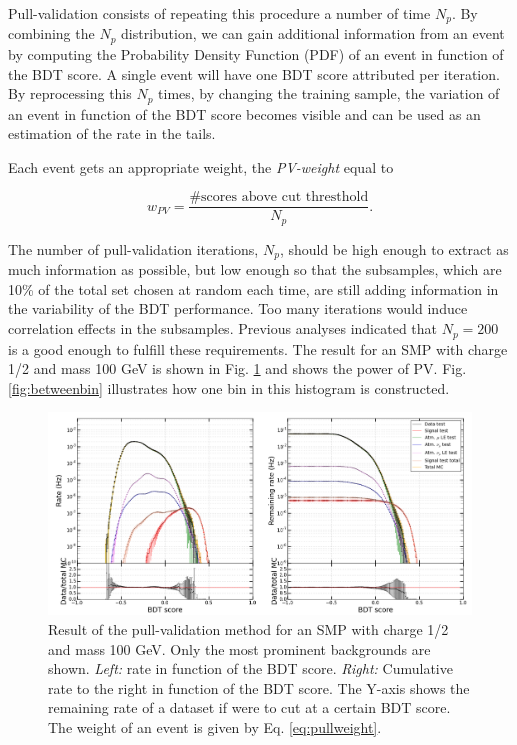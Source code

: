 Pull-validation consists of repeating this procedure a number of time $N_p$. By combining the $N_p$ distribution, we can gain additional information from an event by computing the Probability Density Function (PDF) of an event in function of the BDT score. A single event will have one BDT score attributed per iteration. By reprocessing this $N_p$ times, by changing the training sample, the variation of an event in function of the BDT score becomes visible and can be used as an estimation of the rate in the tails.

Each event gets an appropriate weight, the \textit{PV-weight} equal to

\begin{equation}
\label{eq:pullweight}
w_{PV} = \frac{\# \textrm{scores above cut thresthold}}{N_p}.
\end{equation}

The number of pull-validation iterations, $N_p$, should be high enough to extract as much information as possible, but low enough so that the subsamples, which are 10\% of the total set chosen at random each time, are still adding information in the variability of the BDT performance. Too many iterations would induce correlation effects in the subsamples. Previous analyses indicated that $N_p = 200$ is a good enough to fulfill these requirements. The result for an SMP with charge 1/2 and mass 100 GeV is shown in Fig. \ref{fig:pullval} and shows the power of PV. Fig. \ref{fig:betweenbin} illustrates how one bin in this histogram is constructed.\\
 
\begin{figure}
\centering
\includegraphics[width=\textwidth]{chapter8/img/pullval_result2_signal_m_100_charge1ovr2.png}
\caption{Result of the pull-validation method for an SMP with charge 1/2 and mass 100 GeV. Only the most prominent backgrounds are shown. \textit{Left: }rate in function of the BDT score. \textit{Right: }Cumulative rate to the right in function of the BDT score. The Y-axis shows the remaining rate of a dataset if were to cut at a certain BDT score. The weight of an event is given by Eq. \ref{eq:pullweight}.}
\label{fig:pullval}
\end{figure}

